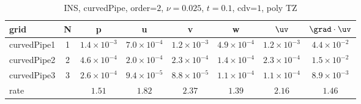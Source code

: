 \begin{table}[hbt]
\begin{center}
\begin{tabular}{|l|c|c|c|c|c|c|c|} \hline\hline 
grid  & N &  p &  u & v & w & $\uv$ & $\grad\cdot\uv$\\ \hline 
         curvedPipe1 &     1 &  $1.4\times10^{ -3}$  &  $7.0\times10^{ -4}$  &  $1.2\times10^{ -3}$  &  $4.9\times10^{ -4}$  &  $1.2\times10^{ -3}$  &  $4.4\times10^{ -2}$   \\ \hline
         curvedPipe2 &     2 &  $4.6\times10^{ -4}$  &  $2.0\times10^{ -4}$  &  $2.3\times10^{ -4}$  &  $1.4\times10^{ -4}$  &  $2.3\times10^{ -4}$  &  $1.5\times10^{ -2}$   \\ \hline
         curvedPipe3 &     3 &  $2.6\times10^{ -4}$  &  $9.4\times10^{ -5}$  &  $8.8\times10^{ -5}$  &  $1.1\times10^{ -4}$  &  $1.1\times10^{ -4}$  &  $8.9\times10^{ -3}$   \\ \hline
    rate            &     &       $1.51$ &       $1.82$ &       $2.37$ &       $1.39$ &       $2.16$ &       $1.46$  \\ \hline\hline
\end{tabular}
\caption{INS, curvedPipe, order=$2$, $\nu=0.025$, $t=0.1$, cdv=$1$, poly TZ}\label{table:curvedPipe}
\end{center}
\end{table}
